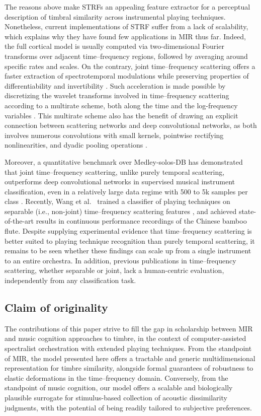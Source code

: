 \documentclass{bmcart}
\makeatletter
\newcommand*{\ie}{i.e.,\@\xspace}
\makeatother
\begin{document}
The reasons above make STRFs an appealing feature extractor for a perceptual description of timbral similarity across instrumental playing techniques.
Nonetheless, current implementations of STRF suffer from a lack of scalability, which explains why they have found few applications in MIR thus far.
Indeed, the full cortical model is usually computed via two-dimensional Fourier transforms over adjacent time--frequency regions, followed by averaging around specific rates and scales.
On the contrary, joint time--frequency scattering offers a faster extraction of spectrotemporal modulations while preserving properties of differentiability \cite{andreux2019jmlr} and invertibility \cite{lostanlen2019dafx}.
Such acceleration is made possible by discretizing the wavelet transforms involved in time--frequency scattering according to a multirate scheme, both along the time and the log-frequency variables \cite{anden2019tsp}.
This multirate scheme also has the benefit of drawing an explicit connection between scattering networks and deep convolutional networks, as both involves numerous convolutions with small kernels, pointwise rectifying nonlinearities, and dyadic pooling operations \cite{mallat2016philtrans}.

Moreover, a quantitative benchmark over Medley-solos-DB has demonstrated that joint time--frequency scattering, unlike purely temporal scattering, outperforms deep convolutional networks in supervised musical instrument classification, even in a relatively large data regime with 500 to 5k samples per class \cite{anden2019tsp}.
Recently, Wang et al.~\cite{wang2019ismir} trained a classifier of playing techniques on separable (\ie{} non-joint) time--frequency scattering features \cite{anden2014tsp}, and achieved state-of-the-art results in continuous performance recordings of the Chinese bamboo flute. %
Despite supplying experimental evidence that time--frequency scattering is better suited to playing technique recognition than purely temporal scattering, it remains to be seen whether these findings can scale up from a single instrument to an entire orchestra.
In addition, previous publications in time--frequency scattering, whether separable or joint, lack a human-centric evaluation, independently from any classification task.

\subsection*{Claim of originality}
The contributions of this paper strive to fill the gap in scholarship between MIR and music cognition approaches to timbre, in the context of computer-assisted spectralist orchestration with extended playing techniques.
From the standpoint of MIR, the model presented here offers a tractable and generic multidimensional representation for timbre similarity, alongside formal guarantees of robustness to elastic deformations in the time--frequency domain.
Conversely, from the standpoint of music cognition, our model offers a scalable and biologically plausible surrogate for stimulus-based collection of acoustic dissimilarity judgments, with the potential of being readily tailored to subjective preferences.
\end{document}
